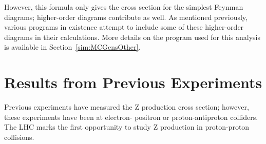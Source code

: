 


However, this formula only gives the cross section 
for the simplest Feynman diagrams; 
higher-order diagrams contribute as well.  
As mentioned previously, various programs 
in existence attempt to include some of these higher-order 
diagrams in their calculations.  
More details on the program used for this analysis 
is available in 
Section~\ref{sim:MCGensOther}. 





\section{Results from Previous Experiments}
\label{theory:prev}

Previous experiments have measured the 
Z production cross section; 
however, these experiments have been at electron-
positron or proton-antiproton colliders.  
The LHC marks the first opportunity to study 
Z production in proton-proton collisions.  %

